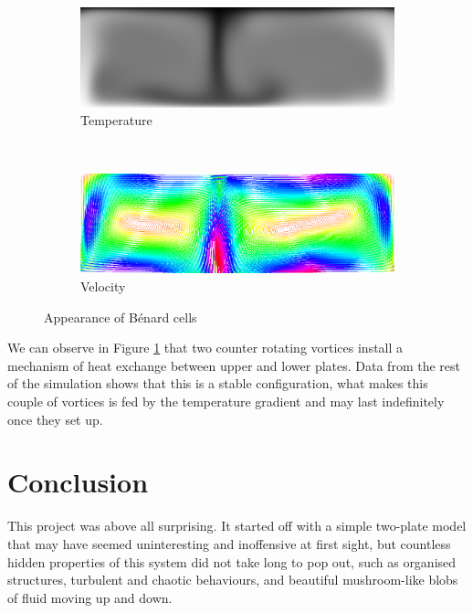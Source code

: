 \documentclass[12pt,oneside]{article}
\begin{document}
\begin{figure}[ht]
  \centering
  \begin{subfigure}[b]{0.95\textwidth}
    \includegraphics[width=\textwidth]{04_0201t.png}
    \caption{Temperature}
  \end{subfigure}
  \\
  \begin{subfigure}[b]{0.95\textwidth}
    \includegraphics[width=\textwidth]{04_0201u.png}
    \caption{Velocity}
  \end{subfigure}
  \caption{Appearance of Bénard cells}\label{fig:bcell}
\end{figure}

We can observe in Figure \ref{fig:bcell} that two counter rotating vortices install a mechanism of heat exchange between upper and lower plates. Data from the rest of the simulation shows that this is a stable configuration, what makes this couple of vortices is fed by the temperature gradient and may last indefinitely once they set up.

\section{Conclusion}

This project was above all surprising. It started off with a simple two-plate model that may have seemed uninteresting and inoffensive at first sight, but countless hidden properties of this system did not take long to pop out, such as organised structures, turbulent and chaotic behaviours, and beautiful mushroom-like blobs of fluid moving up and down.
\end{document}
